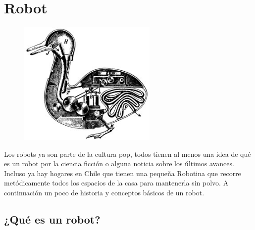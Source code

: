 


\chapter{Robot} %

\label{Chapter2} %




\begin{figure}[htbp]
	\centering
		\includegraphics[width=0.6\textwidth]{./Figures/Duck_of_Vaucanson.jpg}
	\label{fig:Duck}
\end{figure}

Los robots ya son parte de la cultura pop, todos tienen al menos una idea de qué es un robot por la ciencia ficción o alguna noticia sobre los últimos avances. Incluso ya hay hogares en Chile que tienen una pequeña Robotina que recorre metódicamente todos los espacios de la casa para mantenerla sin polvo. A continuación un poco de historia y conceptos básicos de un robot.

\section{¿Qué es un robot?}

